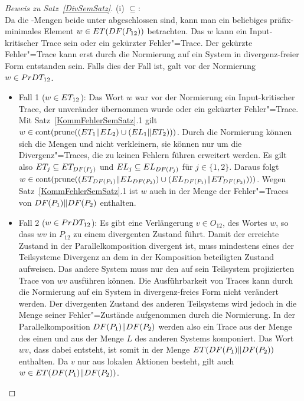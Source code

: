 \begin{proof}[Beweis zu Satz~\ref{DivSemSatz}]
  (i) \glqq $\subseteq$\grqq{}:\\
  Da die \ET{}-Mengen beide unter \cont{} abgeschlossen sind, kann man ein
  beliebiges präfix-minimales Element $w\in ET (DF (P_{12}))$ betrachten.
  Das $w$ kann ein Input-kritischer Trace sein oder ein gekürzter
  Fehler"=Trace. Der gekürzte Fehler"=Trace kann erst durch die Normierung auf
  ein System in divergenz-freier Form entstanden sein. Falls dies der Fall ist,
  galt vor der Normierung $w\in PrDT _{12}$.
  \begin{itemize}
    \item Fall 1 ($w\in ET _{12}$): Das Wort $w$ war vor der Normierung ein
      Input-kritischer Trace, der unveränder übernommen wurde oder ein
      geküzrter Fehler"=Trace. Mit Satz~\ref{KommFehlerSemSatz}.1 gilt $w\in
      \mathrm{cont} (\mathrm{prune} ((ET _1\|EL _2)\cup (EL _1\|ET _2)))$. Durch die
      Normierung können sich die Mengen \ET{} und \EL{} nicht verkleinern, sie
      können nur um die Divergenz"=Traces, die zu keinen Fehlern führen
      erweitert werden. Es gilt also $ET _j \subseteq ET _{DF (P_j)}$ und
      $EL _j \subseteq EL _{DF (P_j)}$ für $j\in \{1,2\}$. Daraus folgt
      $w\in \mathrm{cont} (\mathrm{prune} ((ET _{DF (P_1)}\|EL _{DF (P_2)})\cup (EL _{DF
      (P_1)}\|ET _{DF (P_2)})))$. Wegen Satz~\ref{KommFehlerSemSatz}.1 ist
      $w$ auch in der Menge der Fehler"=Traces von $DF (P_1)\|DF (P_2)$
      enthalten.
    \item Fall 2 ($w\in PrDT _{12}$): Es gibt eine Verlängerung $v\in
      O_{12}$, des Wortes $w$, so dass $wv$ in $P_{12}$ zu einem divergenten
      Zustand führt. Damit der erreichte Zustand in der Parallelkomposition
      divergent ist, muss mindestens eines der Teilsysteme Divergenz an dem
      in der Komposition beteiligten Zustand aufweisen. Das andere System
      muss nur den auf sein Teilsystem projizierten Trace von $wv$ ausführen
      können. Die Ausführbarkeit von Traces kann durch die Normierung auf ein
      System in divergenz-freies Form nicht verändert werden. Der divergenten
      Zustand des anderen Teilsystems wird jedoch in die Menge seiner
      Fehler"=Zustände aufgenommen durch die Normierung. In der
      Parallelkomposition $DF (P_1)\|DF (P_2)$ werden also ein Trace aus
      der Menge \ET{} des einen und aus der Menge $L$ des anderen Systems
      komponiert. Das Wort $wv$, dass dabei entsteht, ist somit in der Menge
      $ET (DF (P_1)\|DF (P_2))$ enthalten. Da $v$ nur aus lokalen Aktionen
      besteht, gilt auch $w\in ET (DF (P_1)\|DF (P_2))$.
  \end{itemize}


\end{proof}
